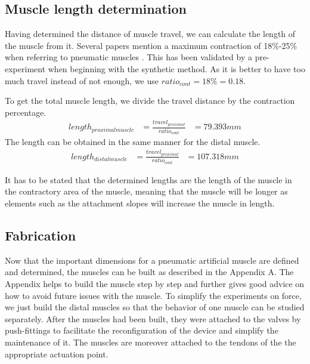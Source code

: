\documentclass[main]{subfiles}
\begin{document}

\subsection{Muscle length determination}

Having determined the distance of muscle travel, we can calculate the length of the muscle from it. Several papers mention a maximum contraction of 18\%-25\% when referring to pneumatic muscles \cite{Klute1999,Hannaford1995}. This has been validated by a pre-experiment when beginning with the synthetic method. As it is better to have too much travel instead of not enough, we use $ratio_{cont} = 18\% = 0.18$.

To get the total muscle length, we divide the travel distance by the contraction percentage.
\[
\begin{aligned}
length_{proximal muscle} &= \frac{travel_{proximal}}{ratio_{cont}}
&= 79.393 mm
\end{aligned}
\]
The length can be obtained in the same manner for the distal muscle.
\[
\begin{aligned}
length_{distal muscle} &= \frac{travel_{proximal}}{ratio_{cont}}
&= 107.318 mm
\end{aligned}
\]

It has to be stated that the determined lengths are the length of the muscle in the contractory area of the muscle, meaning that the muscle will be longer as elements such as the attachment slopes will increase the muscle in length.

\subsection{Fabrication}

Now that the important dimensions for a pneumatic artificial muscle are defined and determined, the muscles can be built as described in the Appendix A. The Appendix helps to build the muscle step by step and further gives good advice on how to avoid future issues with the muscle. To simplify the experiments on force, we just build the distal muscles so that the behavior of one muscle can be studied separately. After the muscles had been built, they were attached to the valves by push-fittings to facilitate the reconfiguration of the device and simplify the maintenance of it. The muscles are moreover attached to the tendons of the the appropriate actuation point.
\end{document}
